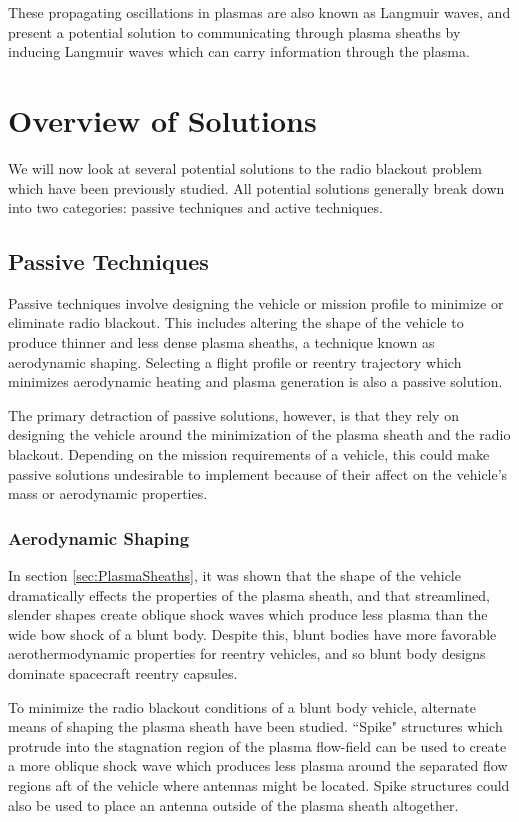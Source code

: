 \documentclass[twocolumn]{article}
\begin{document}
	These propagating oscillations in plasmas are also known as Langmuir waves, and present a potential solution to communicating through plasma sheaths by inducing Langmuir waves which can carry information through the plasma.
	



\section{Overview of Solutions} \label{sec:Overview}
	We will now look at several potential solutions to the radio blackout problem which have been previously studied.
	All potential solutions generally break down into two categories: passive techniques and active techniques.
	
	\subsection*{Passive Techniques}
		Passive techniques involve designing the vehicle or mission profile to minimize or eliminate radio blackout.
		This includes altering the shape of the vehicle to produce thinner and less dense plasma sheaths, a technique known as aerodynamic shaping.
		Selecting a flight profile or reentry trajectory which minimizes aerodynamic heating and plasma generation is also a passive solution.
		
		The primary detraction of passive solutions, however, is that they rely on designing the vehicle around the minimization of the plasma sheath and the radio blackout.
		Depending on the mission requirements of a vehicle, this could make passive solutions undesirable to implement because of their affect on the vehicle's mass or aerodynamic properties.
		
		\subsubsection{Aerodynamic Shaping}
			In section \ref{sec:PlasmaSheaths}, it was shown that the shape of the vehicle dramatically effects the properties of the plasma sheath, and that streamlined, slender shapes create oblique shock waves which produce less plasma than the wide bow shock of a blunt body.
			Despite this, blunt bodies have more favorable aerothermodynamic properties for reentry vehicles, and so blunt body designs dominate spacecraft reentry capsules.
			
			To minimize the radio blackout conditions of a blunt body vehicle, alternate means of shaping the plasma sheath have been studied.
			``Spike" structures which protrude into the stagnation region of the plasma flow-field can be used to create a more oblique shock wave which produces less plasma around the separated flow regions aft of the vehicle where antennas might be located.\cite{hartunian_implications_2007}
			Spike structures could also be used to place an antenna outside of the plasma sheath altogether.\cite{belov_investigation_2001}
			 
\end{document}
